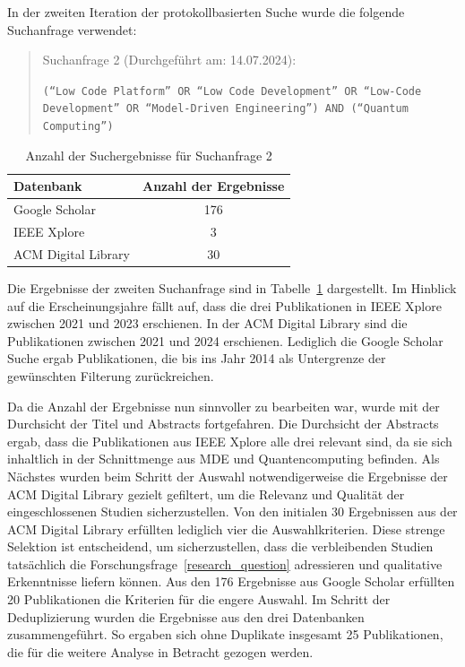 In der zweiten Iteration der protokollbasierten Suche wurde die folgende Suchanfrage verwendet:

\begin{quote}
    Suchanfrage 2 (Durchgeführt am: 14.07.2024):

    \texttt{(``Low Code Platform'' OR ``Low Code Development'' OR ``Low-Code Development'' OR ``Model-Driven Engineering'') AND (``Quantum Computing'')}

\end{quote}

\begin{table}[h!]
    \centering
    \caption{Anzahl der Suchergebnisse für Suchanfrage 2}
    \label{tab:search_2_results}
    \begin{tabular}{|l|c|}
    \hline
    \textbf{Datenbank} & \textbf{Anzahl der Ergebnisse} \\ \hline
    Google Scholar & 176 \\ \hline
    IEEE Xplore & 3 \\ \hline
    ACM Digital Library & 30 \\ \hline
    \end{tabular}
\end{table}

Die Ergebnisse der zweiten Suchanfrage sind in Tabelle~\ref{tab:search_2_results} dargestellt. Im Hinblick auf die Erscheinungsjahre fällt auf, dass 
die drei Publikationen in IEEE Xplore zwischen 2021 und 2023 erschienen. In der ACM Digital Library sind die Publikationen zwischen 2021 und 2024 erschienen. 
Lediglich die Google Scholar Suche ergab Publikationen, die bis ins Jahr 2014 als Untergrenze der gewünschten Filterung zurückreichen. 

Da die Anzahl der Ergebnisse nun sinnvoller zu bearbeiten war, wurde mit der Durchsicht der Titel und Abstracts fortgefahren. 
Die Durchsicht der Abstracts ergab, dass die Publikationen aus IEEE Xplore alle drei relevant sind, da sie sich inhaltlich in der 
Schnittmenge aus MDE und Quantencomputing befinden. Als Nächstes wurden beim Schritt der Auswahl notwendigerweise die 
Ergebnisse der ACM Digital Library gezielt gefiltert, um die Relevanz und Qualität der eingeschlossenen Studien sicherzustellen. 
Von den initialen 30 Ergebnissen aus der ACM Digital Library erfüllten lediglich vier die Auswahlkriterien. Diese strenge Selektion ist entscheidend, um 
sicherzustellen, dass die verbleibenden Studien tatsächlich die Forschungsfrage~\ref{research_question} adressieren und qualitative Erkenntnisse liefern können. 
Aus den 176 Ergebnisse aus Google Scholar erfüllten 20 Publikationen die Kriterien für die engere Auswahl. 
Im Schritt der Deduplizierung wurden die Ergebnisse aus den drei Datenbanken zusammengeführt. 
So ergaben sich ohne Duplikate insgesamt 25 Publikationen, die für die weitere Analyse in Betracht gezogen werden. 


